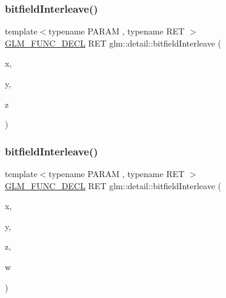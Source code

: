 \mbox{\label{namespaceglm_1_1detail_aa2fdd8f720417a13990873ba704a3426}} 
\subsubsection{\texorpdfstring{bitfield\+Interleave()}{bitfieldInterleave()}\hspace{0.1cm}{\footnotesize\ttfamily [2/11]}}
{\footnotesize\ttfamily template$<$typename P\+A\+R\+AM , typename R\+ET $>$ \\
\hyperlink{setup_8hpp_ab2d052de21a70539923e9bcbf6e83a51}{G\+L\+M\+\_\+\+F\+U\+N\+C\+\_\+\+D\+E\+CL} R\+ET glm\+::detail\+::bitfield\+Interleave (\begin{DoxyParamCaption}\item[{P\+A\+R\+AM}]{x,  }\item[{P\+A\+R\+AM}]{y,  }\item[{P\+A\+R\+AM}]{z }\end{DoxyParamCaption})}

\mbox{\label{namespaceglm_1_1detail_a606f6dc8c8314159fafef68f820c2c65}} 
\subsubsection{\texorpdfstring{bitfield\+Interleave()}{bitfieldInterleave()}\hspace{0.1cm}{\footnotesize\ttfamily [3/11]}}
{\footnotesize\ttfamily template$<$typename P\+A\+R\+AM , typename R\+ET $>$ \\
\hyperlink{setup_8hpp_ab2d052de21a70539923e9bcbf6e83a51}{G\+L\+M\+\_\+\+F\+U\+N\+C\+\_\+\+D\+E\+CL} R\+ET glm\+::detail\+::bitfield\+Interleave (\begin{DoxyParamCaption}\item[{P\+A\+R\+AM}]{x,  }\item[{P\+A\+R\+AM}]{y,  }\item[{P\+A\+R\+AM}]{z,  }\item[{P\+A\+R\+AM}]{w }\end{DoxyParamCaption})}

\mbox{\label{namespaceglm_1_1detail_ac59c574dc7900d87786f5a96f82ea6e7}} 
